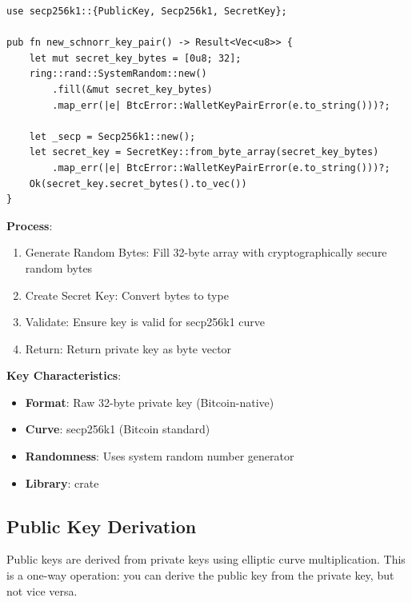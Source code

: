\begin{listing}[htbp]
\caption{Schnorr key pair generation ()}
\label{lst:ch08-schnorr-keypair-gen}
\begin{verbatim}
use secp256k1::{PublicKey, Secp256k1, SecretKey};

pub fn new_schnorr_key_pair() -> Result<Vec<u8>> {
    let mut secret_key_bytes = [0u8; 32];
    ring::rand::SystemRandom::new()
        .fill(&mut secret_key_bytes)
        .map_err(|e| BtcError::WalletKeyPairError(e.to_string()))?;

    let _secp = Secp256k1::new();
    let secret_key = SecretKey::from_byte_array(secret_key_bytes)
        .map_err(|e| BtcError::WalletKeyPairError(e.to_string()))?;
    Ok(secret_key.secret_bytes().to_vec())
}
\end{verbatim}
\end{listing}

\textbf{Process}:
\begin{enumerate}
  \item Generate Random Bytes: Fill 32-byte array with cryptographically secure random bytes
  \item Create Secret Key: Convert bytes to  type
  \item Validate: Ensure key is valid for secp256k1 curve
  \item Return: Return private key as byte vector
\end{enumerate}

\textbf{Key Characteristics}:
\begin{itemize}
  \item \textbf{Format}: Raw 32-byte private key (Bitcoin-native)
  \item \textbf{Curve}: secp256k1 (Bitcoin standard)
  \item \textbf{Randomness}: Uses system random number generator
  \item \textbf{Library}:  crate
\end{itemize}

\subsection{Public Key Derivation}
\label{sec:ch08-pubkey-derivation}

Public keys are derived from private keys using elliptic curve multiplication. This is a one-way operation: you can derive the public key from the private key, but not vice versa.

